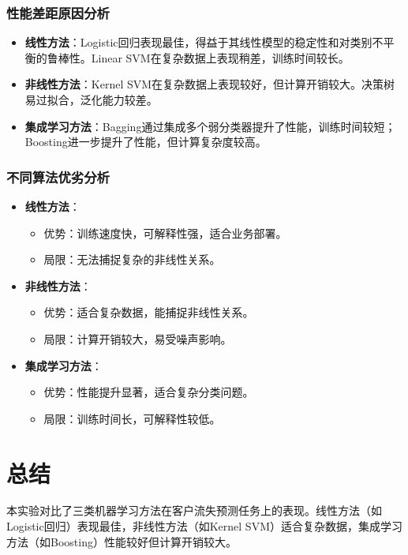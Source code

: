 \documentclass{article}
\begin{document}
\subsubsection{性能差距原因分析}
\begin{itemize}
    \item \textbf{线性方法}：Logistic回归表现最佳，得益于其线性模型的稳定性和对类别不平衡的鲁棒性。Linear SVM在复杂数据上表现稍差，训练时间较长。
    \item \textbf{非线性方法}：Kernel SVM在复杂数据上表现较好，但计算开销较大。决策树易过拟合，泛化能力较差。
    \item \textbf{集成学习方法}：Bagging通过集成多个弱分类器提升了性能，训练时间较短；Boosting进一步提升了性能，但计算复杂度较高。
\end{itemize}

\subsubsection{不同算法优劣分析}
\begin{itemize}
    \item \textbf{线性方法}：
        \begin{itemize}
            \item 优势：训练速度快，可解释性强，适合业务部署。
            \item 局限：无法捕捉复杂的非线性关系。
        \end{itemize}
    \item \textbf{非线性方法}：
        \begin{itemize}
            \item 优势：适合复杂数据，能捕捉非线性关系。
            \item 局限：计算开销较大，易受噪声影响。
        \end{itemize}
    \item \textbf{集成学习方法}：
        \begin{itemize}
            \item 优势：性能提升显著，适合复杂分类问题。
            \item 局限：训练时间长，可解释性较低。
        \end{itemize}
\end{itemize}

\section{总结}
本实验对比了三类机器学习方法在客户流失预测任务上的表现。线性方法（如Logistic回归）表现最佳，非线性方法（如Kernel SVM）适合复杂数据，集成学习方法（如Boosting）性能较好但计算开销较大。
\end{document}

